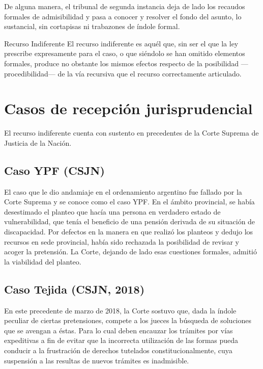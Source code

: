 \documentclass[12pt,oneside]{book}
\begin{document}
De alguna manera, el tribunal de segunda instancia deja de lado los recaudos formales de admisibilidad y pasa a conocer y resolver el fondo del asunto, lo sustancial, sin cortapisas ni trabazones de índole formal.

\begin{definition}{Recurso Indiferente}
El recurso indiferente es aquél que, sin ser el que la ley prescribe expresamente para el caso, o que siéndolo se han omitido elementos formales, produce no obstante los mismos efectos respecto de la posibilidad ---procedibilidad--- de la vía recursiva que el recurso correctamente articulado.
\end{definition}

\section{Casos de recepción jurisprudencial}

El recurso indiferente cuenta con sustento en precedentes de la Corte Suprema de Justicia de la Nación.

\subsection{Caso YPF (CSJN)}

El caso que le dio andamiaje en el ordenamiento argentino fue fallado por la Corte Suprema y se conoce como el caso YPF. En el ámbito provincial, se había desestimado el planteo que hacía una persona en verdadero estado de vulnerabilidad, que tenía el beneficio de una pensión derivada de su situación de discapacidad. Por defectos en la manera en que realizó los planteos y dedujo los recursos en sede provincial, había sido rechazada la posibilidad de revisar y acoger la pretensión. La Corte, dejando de lado esas cuestiones formales, admitió la viabilidad del planteo.

\subsection{Caso Tejida (CSJN, 2018)}

En este precedente de marzo de 2018, la Corte sostuvo que, dada la índole peculiar de ciertas pretensiones, compete a los jueces la búsqueda de soluciones que se avengan a éstas. Para lo cual deben encauzar los trámites por vías expeditivas a fin de evitar que la incorrecta utilización de las formas pueda conducir a la frustración de derechos tutelados constitucionalmente, cuya suspensión a las resultas de nuevos trámites es inadmisible.
\end{document}
